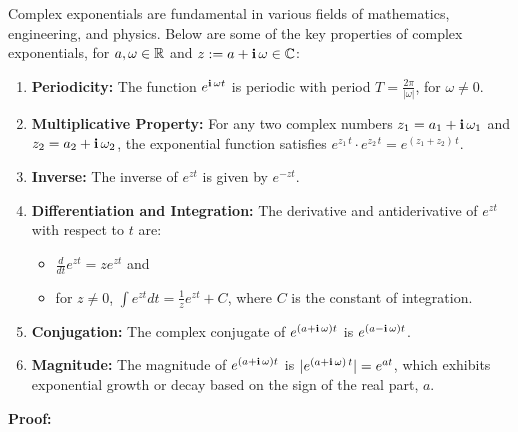 \bigskip

\begin{tcolorbox}[title=\textcolor{black}{Proof of Prop.~\ref{thm:PropertiesComplexExponentials} (Properties of Complex Exponentials)}, sharp corners, colback=green!30, colframe=green!80!blue, breakable, fonttitle=\bfseries]

Complex exponentials are fundamental in various fields of mathematics, engineering, and physics. Below are some of the key properties of complex exponentials, for $a, \omega \in \mathbb R$ and
$z:= a + \mathop{\bm{\mathrm i}} \omega \in \mathbb C$:

\begin{enumerate}
\renewcommand{\labelenumi}{(\alph{enumi})}
\setlength{\itemsep}{.2cm}
   
    \item \textbf{Periodicity:} The function $e^{\mathop{\bm{\mathrm i}} \omega t}$ is periodic with period $T = \frac{2\pi}{|\omega|}$, for $\omega \neq 0$.

    \item \textbf{Multiplicative Property:} For any two complex numbers $z_1 = a_1 + \mathop{\bm{\mathrm i}} \omega_1$ and $z_2 = a_2 + \mathop{\bm{\mathrm i}} \omega_2$, the exponential function satisfies $e^{z_1\, t}\cdot e^{z_2 \, t} = e^{\left(z_1 + z_2\right)\, t}$.

    \item \textbf{Inverse:} The inverse of $e^{zt}$ is given by $e^{-zt}$.

    \item \textbf{Differentiation and Integration:} The derivative and antiderivative of $e^{zt}$ with respect to $t$ are: 
    \begin{itemize}
        \item $\frac{d}{dt}e^{zt} = ze^{zt}$ and 

        \item for $z \neq 0$, $\int e^{zt} dt = \frac{1}{z}e^{zt} + C$, where $C$ is the constant of integration.

    \end{itemize}
    \item \textbf{Conjugation:} The complex conjugate of $e^{\left(a + \mathop{\bm{\mathrm i}} \omega \right)t}$ is $e^{\left(a - \mathop{\bm{\mathrm i}} \omega \right)t}$.

    \item \textbf{Magnitude:} The magnitude of $e^{\left(a+ \mathop{\bm{\mathrm i}} \omega \right)t}$ is $|e^{\left(a+ \mathop{\bm{\mathrm i}} \omega \right)\, t}| = e^{at}$, which exhibits exponential growth or decay based on the sign of the real part,  $a$.
\end{enumerate}

  
\end{tcolorbox}
\textbf{Proof:}

